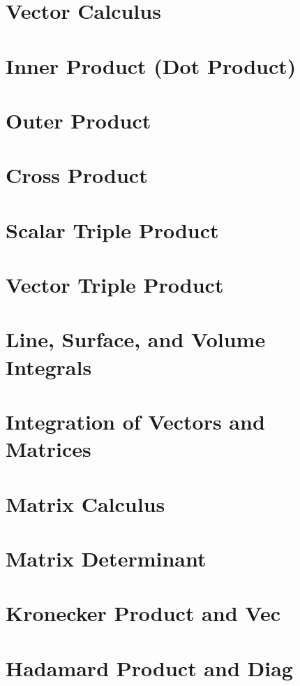 \section{Vector Calculus}
\section{Inner Product (Dot Product)}

\section{Outer Product}
\section{Cross Product}

\section{Scalar Triple Product}
\section{Vector Triple Product}
\section{Line, Surface, and Volume Integrals}
\section{Integration of Vectors and Matrices}


\section{Matrix Calculus}
\section{Matrix Determinant}
\section{Kronecker Product and Vec}
\section{Hadamard Product and Diag}
